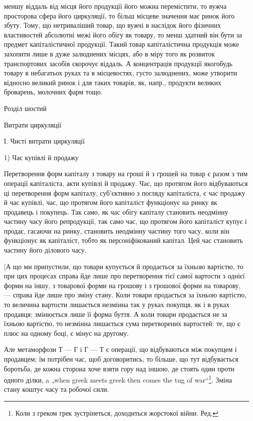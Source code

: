 меншу віддаль від місця його продукції його можна перемістити, то
вужча просторова сфера його циркуляції, то більш місцеве значення має
ринок його збуту. Тому, що нетриваліший товар, що вужчі в наслідок
його фізичних властивостей абсолютні межі його обігу як товару, то
менш здатний він бути за предмет капіталістичної продукції. Такий
товар капіталістична продукція може захопити лише в дуже залюднених
місцях, або в міру того як розвиток транспортових засобів скорочує
віддаль. А концентрація продукції якогобудь товару в небагатьох руках
та в місцевостях, густо залюднених, може утворити відносно великий ринок
і для таких товарів, як, напр., продукти великих броварень, молочних
фарм тощо.

Розділ шостий

Витрати циркуляції

І. Чисті витрати циркуляції

1) Час купівлі й продажу

Перетворення форм капіталу з товару на гроші й з грошей на
товар є разом з тим операції капіталіста, акти купівлі й продажу. Час,
що протягом його відбуваються ці перетворення форм капіталу, суб’єктивно
з погляду капіталіста, є час продажу й час купівлі, час, що протягом
його капіталіст функціонує на ринку як продавець і покупець. Так само,
як час обігу капіталу становить неодмінну частину часу його репродукції,
так само час, що протягом його капіталіст купує і продає, гасаючи на
ринку, становить неодмінну частину того часу, коли він функціонує як
капіталіст, тобто як персоніфікований капітал. Цей час становить частину
його ділового часу.

[А що ми припустили, що товари купується й продається за їхньою
вартістю, то при цих процесах справа йде лише про перетворення тієї
самої вартости з однієї форми на іншу, з товарової форми на грошову
і з грошової форми на товарову, — справа йде лише про зміну стану.
Коли товари продається за їхньою вартістю, то величина вартости
лишається незмінна так у руках покупця, як і в руках продавця; змінюється
лише її форма буття. А коли товари продається не за їхньою вартістю,
то незмінна лишається сума перетворених вартостей: те, що є плюс на
одному боці, є мінус на другому.

Але метаморфози Т — Г і Г — Т є операції, що відбуваються між
покупцем і продавцем; їм потрібен час, щоб договоритись, то більше,
що тут відбувається боротьба, де кожна сторона хоче взяти гору над
іншою, де стоять один проти одного ділки, a „when greek meets greek
then comes the tug of war“\footnote*{
Коли з греком грек зустрінеться, доходиться жорстокої війни. Ред.
}. Зміна стану коштує часу та робочої сили.